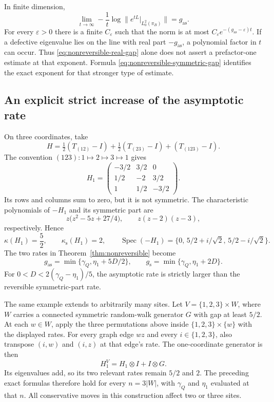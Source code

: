 \begin{remark}
In finite dimension,
\[
 \lim_{t\to\infty}-\frac1t
       \log\|e^{tL}|_{L^2_0(\pi_B)}\|=g_{\mathrm{as}}.
\]
For every $\varepsilon>0$ there is a finite $C_\varepsilon$ such that
the norm is at most
$C_\varepsilon e^{-(g_{\mathrm{as}}-\varepsilon)t}$.
If a defective eigenvalue lies on the line with real part
$-g_{\mathrm{as}}$, a polynomial factor in $t$ can occur.
Thus \eqref{eq:nonreversible-real-gap} alone does not assert a
prefactor-one estimate at that exponent.  Formula
\eqref{eq:nonreversible-symmetric-gap} identifies the exact exponent
for that stronger type of estimate.
\end{remark}

\subsection{An explicit strict increase of the asymptotic rate}

On three coordinates, take
\[
 H=\tfrac12(T_{(12)}-I)+\tfrac12(T_{(23)}-I)
       +(T_{(123)}-I).
\]
The convention $(123):1\mapsto2\mapsto3\mapsto1$ gives
\begin{equation}\label{eq:three-site-matrix}
 H_1=
 \begin{pmatrix}
  -3/2&3/2&0\\
  1/2&-2&3/2\\
  1&1/2&-3/2
 \end{pmatrix}.
\end{equation}
Its rows and columns sum to zero, but it is not symmetric.
The characteristic polynomials of $-H_1$ and its symmetric part are
\[
 z\bigl(z^2-5z+27/4\bigr),
 \qquad z(z-2)(z-3),
\]
respectively.  Hence
\[
 \kappa(H_1)=\frac52,\qquad
 \kappa_{\mathrm{s}}(H_1)=2,
 \qquad
 \operatorname{Spec}(-H_1)
   =\{0,\,5/2+i/\sqrt2,\,5/2-i/\sqrt2\}.
\]
The two rates in Theorem~\ref{thm:nonreversible} become
\[
 g_{\mathrm{as}}=\min\{\gamma_Q,\eta_1+5D/2\},
 \qquad
 g_{\mathrm{s}}=\min\{\gamma_Q,\eta_1+2D\}.
\]
For $0<D<2(\gamma_Q-\eta_1)/5$, the asymptotic rate is strictly
larger than the reversible symmetric-part rate.

The same example extends to arbitrarily many sites.
Let $V=\{1,2,3\}\times W$, where $W$ carries a connected symmetric
random-walk generator $G$ with gap at least $5/2$.
At each $w\in W$, apply the three permutations above inside
$\{1,2,3\}\times\{w\}$ with the displayed rates.
For every graph edge $wz$ and every $i\in\{1,2,3\}$, also transpose
$(i,w)$ and $(i,z)$ at that edge's rate.
The one-coordinate generator is then
\[
 H_1^{V}=H_1\otimes I+I\otimes G.
\]
Its eigenvalues add, so its two relevant rates remain $5/2$ and $2$.
The preceding exact formulas therefore hold for every
$n=3|W|$, with $\gamma_Q$ and $\eta_1$ evaluated at that $n$.
All conservative moves in this construction affect two or three sites.


